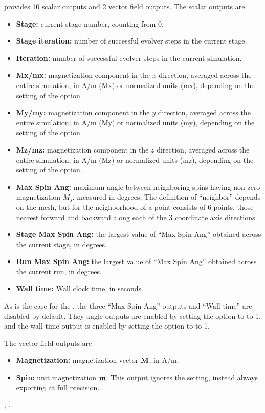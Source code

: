 \begin{description}
 provides 10 scalar outputs and 2 vector
field outputs.  The scalar outputs are
\begin{itemize}
\item \textbf{Stage:} current stage number, counting from 0.
\item \textbf{Stage iteration:} number of successful evolver steps
in the current stage.
\item \textbf{Iteration:} number of successful evolver steps in the
current simulation.
\item \textbf{Mx/mx:} magnetization component in the $x$ direction,
averaged across the entire simulation, in A/m (Mx) or normalized units
(mx), depending on the setting of the 
option.
\item \textbf{My/my:} magnetization component in the $y$ direction,
averaged across the entire simulation, in A/m (My) or normalized units
(my), depending on the setting of the 
option.
\item \textbf{Mz/mz:} magnetization component in the $z$ direction,
averaged across the entire simulation, in A/m (Mz) or normalized units
(mz), depending on the setting of the 
option.
\item \textbf{Max Spin Ang:} maximum angle between neighboring spins
having non-zero magnetization $M_s$, measured in degrees.  The definition
of ``neighbor'' depends on the mesh, but for 
the neighborhood of a point consists of 6 points, those nearest
forward and backward along each of the 3 coordinate axis directions.
\item \textbf{Stage Max Spin Ang:} the largest value of ``Max Spin
Ang'' obtained across the current stage, in degrees.
\item \textbf{Run Max Spin Ang:} the largest value of ``Max Spin
Ang'' obtained across the current run, in degrees.
\item \textbf{Wall time:} Wall clock time, in seconds.
\end{itemize}
As is the case for the , the three ``Max Spin Ang''
outputs and ``Wall time'' are disabled by default.  They angle outputs
are enabled by setting the  option to
to 1, and the wall time output is enabled by setting the
 option to to 1.

The vector field outputs are
\begin{itemize}
\item \textbf{Magnetization:} magnetization vector $\textbf{M}$, in A/m.
\item \textbf{Spin:} unit magnetization $\textbf{m}$.  This output ignores the
  setting, instead
always exporting at full precision.
\end{itemize}

\begin{ExampleMifs}
  , .
\end{ExampleMifs}

\end{description}


